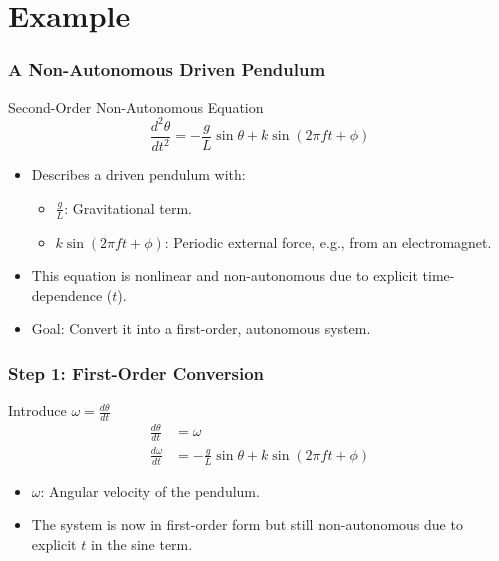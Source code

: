 \documentclass{beamer}
\begin{document}
\section{Example}

\begin{frame}

\frametitle{A Non-Autonomous Driven Pendulum}

\begin{block}{Second-Order Non-Autonomous Equation}
\[
\frac{d^2\theta}{dt^2} = -\frac{g}{L} \sin\theta + k \sin(2\pi f t + \phi) \tag{6.7}
\]
\begin{itemize}
    \item Describes a driven pendulum with:
    \begin{itemize}
        \item \(\frac{g}{L}\): Gravitational term.
        \item \(k \sin(2\pi f t + \phi)\): Periodic external force, e.g., from an electromagnet.
    \end{itemize}
    \item This equation is nonlinear and non-autonomous due to explicit time-dependence (\(t\)).
\end{itemize}
\end{block}

\begin{itemize}
    \item Goal: Convert it into a first-order, autonomous system.
\end{itemize}

\end{frame}

\begin{frame}
\frametitle{Step 1: First-Order Conversion}

\begin{block}{Introduce \(\omega = \frac{d\theta}{dt}\)}
\begin{align}
\frac{d\theta}{dt} &= \omega \tag{6.8} \\
\frac{d\omega}{dt} &= -\frac{g}{L} \sin\theta + k \sin(2\pi f t + \phi) \tag{6.9}
\end{align}
\end{block}

\begin{itemize}
    \item \(\omega\): Angular velocity of the pendulum.
    \item The system is now in first-order form but still non-autonomous due to explicit \(t\) in the sine term.
\end{itemize}

\end{frame}
\end{document}
